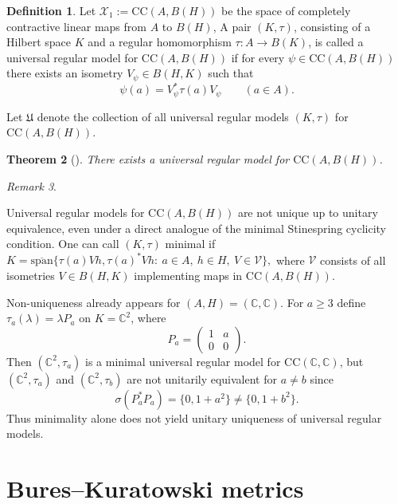 \documentclass[11pt]{amsart}
\newtheorem{theorem}{Theorem}[section]
\theoremstyle{definition}
\newtheorem{definition}[theorem]{Definition}
\theoremstyle{remark}
\newtheorem{remark}[theorem]{Remark}
\newcommand{\C}{\mathbb C}
\newcommand{\1}{\mathbbm{1}}
\newcommand{\CC}{\mathrm{CC}}
\begin{document}
\begin{definition}
\label{def:univ-reg-model}  Let $\mathcal X_1:=\CC(A,B(H))$ be the space of completely contractive linear maps from $A$ to $B(H)$,
A pair $(K,\tau)$, consisting of a Hilbert space $K$ and a regular homomorphism
$\tau:A\to B(K)$, is called a universal regular model for $\CC(A,B(H))$ if for every
$\psi\in \CC(A,B(H))$ there exists an isometry $V_\psi\in B(H,K)$ such that
\[
\psi(a)=V_\psi^*\tau(a)V_\psi\qquad(a\in A).
\]\end{definition}
Let $\mathfrak U$ denote the collection of all universal regular models $(K,\tau)$ for $\CC(A,B(H))$.

\begin{theorem}[{\cite[Thm.\ 3.5]{BMS2017}}]\label{thm:BMS-3-5}
 There exists a universal regular model for $\CC(A,B(H))$.
\end{theorem}

\begin{remark}\label{rem:non-uniqueness}

Universal regular models for $\CC(A,B(H))$ are not unique up to unitary equivalence,
even under a direct analogue of the minimal Stinespring cyclicity condition. 
One can call $(K,\tau)$ minimal if $K=\overline{\mathrm{span}}\{\tau(a)Vh,\tau(a)^*Vh:\ a\in A,\ h\in H,\ V\in\mathcal V\},$
where $\mathcal V$ consists of all isometries $V\in B(H,K)$ implementing maps in $\CC(A,B(H))$.

Non-uniqueness already appears for $(A,H)=(\mathbb C,\mathbb C)$.
For $a\ge3$ define $\tau_a(\lambda)=\lambda P_a$ on $K=\mathbb C^2$, where
\[
P_a=\begin{pmatrix}1&a\\0&0\end{pmatrix}.
\]
Then $(\mathbb C^2,\tau_a)$ is a minimal universal regular model for $\CC(\C,\C)$, but $(\mathbb C^2,\tau_a)$ and $(\mathbb C^2,\tau_b)$ are not unitarily equivalent for $a\neq b$ since
\[
\sigma(P_a^*P_a)=\{0,1+a^2\}\neq\{0,1+b^2\}.
\]
Thus minimality alone does not yield unitary uniqueness of universal regular models.
\end{remark}


\section{Bures--Kuratowski metrics}\label{sec:reg}
\end{document}
